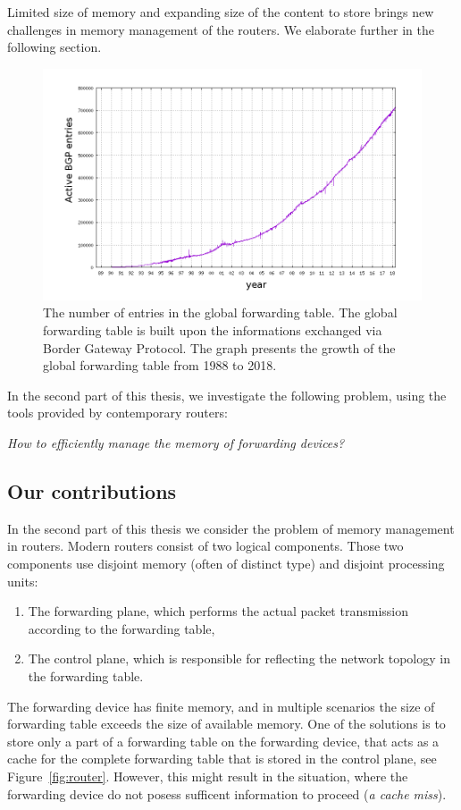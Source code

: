 Limited size of memory and expanding size of the content to store brings new challenges in memory management of the routers.
We elaborate further in the following section.

\begin{figure}[h]
\centering
\includegraphics[width=0.59\columnwidth]{figs/bgp-entries.png}
\caption{The number of entries in the global forwarding table. The global forwarding table is built upon the informations exchanged via Border Gateway Protocol. The graph presents the growth of the global forwarding table from 1988 to 2018.}\label{fig:bgp-entries}
\vspace{-1em}
\end{figure}



In the second part of this thesis, we investigate the following problem, using the tools provided by contemporary routers:
\begin{center}
  \emph{How to efficiently manage the memory of forwarding devices?}
\end{center}


\subsection{Our contributions}

In the second part of this thesis we consider the problem of memory management in routers.
Modern routers consist of two logical components. Those two components use disjoint memory (often of distinct type) and disjoint processing units:
\begin{enumerate}
  \item The forwarding plane, which performs the actual packet transmission according to the forwarding table,
  \item The control plane, which is responsible for reflecting the network topology in the forwarding table.
\end{enumerate}

The forwarding device has finite memory, and in multiple scenarios the size of forwarding table exceeds the size of available memory.
One of the solutions is to store only a part of a forwarding table on the forwarding device, that acts as a cache for the complete forwarding table that is stored in the control plane, see Figure~\ref{fig:router}.
However, this might result in the situation, where the forwarding device do not posess sufficent information to proceed (\emph{a cache miss}).

